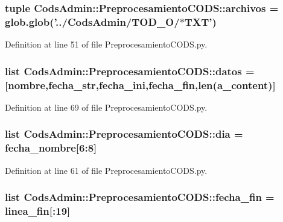\subsubsection[{archivos}]{\setlength{\rightskip}{0pt plus 5cm}tuple {\bf \-Cods\-Admin\-::\-Preprocesamiento\-C\-O\-D\-S\-::archivos} = glob.\-glob('../\-Cods\-Admin/\-T\-O\-D\-\_\-\-O/$\ast$\-T\-X\-T')}\label{namespace_cods_admin_1_1_preprocesamiento_c_o_d_s_a51e3aca942068c4380b4a39b7b9c3f47}


\-Definition at line 51 of file \-Preprocesamiento\-C\-O\-D\-S.\-py.

\subsubsection[{datos}]{\setlength{\rightskip}{0pt plus 5cm}list {\bf \-Cods\-Admin\-::\-Preprocesamiento\-C\-O\-D\-S\-::datos} = [{\bf nombre},{\bf fecha\-\_\-str},{\bf fecha\-\_\-ini},{\bf fecha\-\_\-fin},len({\bf a\-\_\-content})]}\label{namespace_cods_admin_1_1_preprocesamiento_c_o_d_s_a540413dfa48c0d29703eef8881cdb4b6}


\-Definition at line 69 of file \-Preprocesamiento\-C\-O\-D\-S.\-py.

\subsubsection[{dia}]{\setlength{\rightskip}{0pt plus 5cm}list {\bf \-Cods\-Admin\-::\-Preprocesamiento\-C\-O\-D\-S\-::dia} = {\bf fecha\-\_\-nombre}[6\-:8]}\label{namespace_cods_admin_1_1_preprocesamiento_c_o_d_s_a1f7d4aa29c7c972f682929e03289f2b0}


\-Definition at line 61 of file \-Preprocesamiento\-C\-O\-D\-S.\-py.

\subsubsection[{fecha\-\_\-fin}]{\setlength{\rightskip}{0pt plus 5cm}list {\bf \-Cods\-Admin\-::\-Preprocesamiento\-C\-O\-D\-S\-::fecha\-\_\-fin} = {\bf linea\-\_\-fin}[\-:19]}\label{namespace_cods_admin_1_1_preprocesamiento_c_o_d_s_a936ef6cf493909e4a94482eae416a521}


